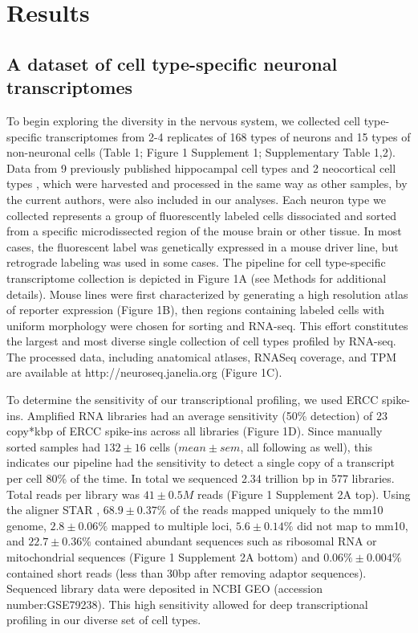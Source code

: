 \section{Results}

\subsection{A dataset of cell type-specific neuronal transcriptomes}
To begin exploring the diversity in the nervous system, we collected cell type-specific transcriptomes from 2-4 replicates of 168 types of neurons and 15 types of non-neuronal cells (Table 1; Figure 1 Supplement 1; Supplementary Table 1,2). Data from 9 previously published hippocampal cell types \citep{Cembrowski_2016} and 2 neocortical cell types \citep{Shima_2016}, which were harvested and processed in the same way as other samples, by the current authors, were also included in our analyses. Each neuron type we collected represents a group of fluorescently labeled cells dissociated and sorted from a specific microdissected region of the mouse brain or other tissue. In most cases, the fluorescent label was genetically expressed in a mouse driver line, but retrograde labeling was used in some cases. The pipeline for cell type-specific transcriptome collection is depicted in Figure 1A (see Methods for additional details). Mouse lines were first characterized by generating a high resolution atlas of reporter expression (Figure 1B), then regions containing labeled cells with uniform morphology were chosen for sorting and RNA-seq. This effort constitutes the largest and most diverse single collection of cell types profiled by RNA-seq. The processed data, including anatomical atlases, RNASeq coverage, and TPM are available at http://neuroseq.janelia.org (Figure 1C). 

To determine the sensitivity of our transcriptional profiling, we used ERCC spike-ins. Amplified RNA libraries had an average sensitivity (50\% detection) of 23 copy*kbp of ERCC spike-ins across all libraries (Figure 1D). Since manually sorted samples had $132\pm16$ cells ($mean\pm sem$, all following as well), this indicates our pipeline had the sensitivity to detect a single copy of a transcript per cell 80\% of the time. In total we sequenced 2.34 trillion bp in 577 libraries. Total reads per library was $41\pm0.5M$ reads (Figure 1 Supplement 2A top). Using the aligner STAR \citep{Dobin_2012}, $68.9\pm0.37\%$ of the reads mapped uniquely to the mm10 genome, $2.8\pm0.06\%$ mapped to multiple loci, $5.6\pm0.14\%$ did not map to mm10, and $22.7\pm0.36\%$ contained abundant sequences such as ribosomal RNA or mitochondrial sequences (Figure 1 Supplement 2A bottom) and $0.06\%\pm 0.004\%$ contained short reads (less than 30bp after removing adaptor sequences). Sequenced library data were deposited in NCBI GEO (accession number:GSE79238). This high sensitivity allowed for deep transcriptional profiling in our diverse set of cell types.

